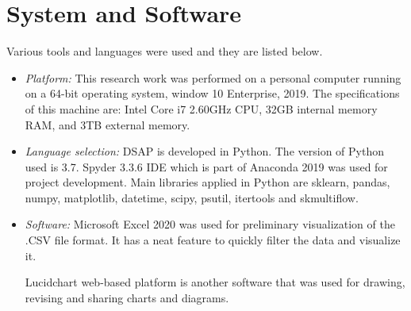% 






\section{System and Software}

Various tools and languages were used and they are listed below.

\begin{itemize}
    \item\textit{Platform:} This research work was performed on a personal computer running on a 64-bit operating system, window 10 Enterprise, 2019. The specifications of this machine are: Intel Core i7 2.60GHz CPU, 32GB internal memory RAM, and 3TB external memory. 
    \item\textit{Language selection:} DSAP is developed in Python. The version of Python used is 3.7. Spyder 3.3.6 IDE which is part of Anaconda 2019 was used for project development. Main libraries applied in Python are sklearn, pandas, numpy, matplotlib, datetime, scipy, psutil, itertools and skmultiflow.
    
    
    \item\textit{Software:} Microsoft Excel 2020 was used for preliminary visualization of the .CSV file format. It has a neat feature to quickly filter the data and visualize it.
    
    Lucidchart web-based platform is another software that was used for drawing, revising and sharing charts and diagrams.
    

\end{itemize}


